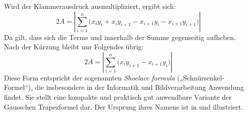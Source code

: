 Wird der Klammerausdruck ausmultipliziert, ergibt sich:
\[
2A = \left| \sum_{i=1}^{n} \big( x_i y_i + x_i y_{i+1} - x_{i+1} y_i - x_{i+1} y_{i+1} \big) \right|
\]
Da gilt, dass sich die Terme  und  innerhalb der Summe gegenseitig aufheben.
Nach der Kürzung bleibt nur Folgendes übrig:
\[
2A = \left| \sum_{i=1}^{n} \big( x_i y_{i+1} - x_{i+1} y_i \big) \right|
\]
Diese Form entspricht der sogenannten \textit{Shoelace formula} („Schnürsenkel-Formel“), die insbesondere in der Informatik und Bildverarbeitung Anwendung findet.
Sie stellt eine kompakte und praktisch gut anwendbare Variante der Gausschen Trapezformel dar.\footnotemark
{}
Der Ursprung ihres Namens ist in  und  illustriert.\footnotemark
{}

